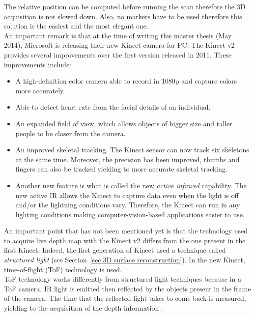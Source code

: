 The relative position can be computed before running the scan therefore the 3D acquisition is not slowed down. Also, no markers have to be used therefore this solution is the easiest and the most elegant one.\\

An important remark is that at the time of writing this master thesis (May 2014), Microsoft is releasing their new Kinect camera for PC. The Kinect v2 provides several improvements over the first version released in 2011. These improvements include:\\

\begin{itemize}
  \item A high-definition color camera able to record in 1080p and capture colors more accurately.
  \item Able to detect heart rate from the facial details of an individual.
  \item An expanded field of view, which allows objects of bigger size and taller people to be closer from the camera.
  \item An improved skeletal tracking. The Kinect sensor can now track six skeletons at the same time. Moreover, the precision has been improved, thumbs and fingers can also be tracked yielding to more accurate skeletal tracking.
  \item Another new feature is what is called the new \textit{active infrared} capability. The new active IR allows the Kinect to capture data even when the light is off and/or the lightning conditions vary. Therefore, the Kinect can run in any lighting conditions making computer-vision-based applications easier to use. 
\end{itemize}


An important point that has not been mentioned yet is that the technology used to acquire live depth map with the Kinect v2 differs from the one present in the first Kinect. Indeed, the first generation of Kinect used a technique called \textit{structured light} (see Section~\ref{sec:3D surface reconstruction}). In the new Kinect, time-of-flight (ToF) technology is used. \\

ToF technology works differently from structured light techniques because in a ToF camera, IR light is emitted then reflected by the objects present in the frame of the camera. The time that the reflected light takes to come back is measured, yielding to the acquisition of the depth information \cite{kolb_time--flight_2010}.\\

